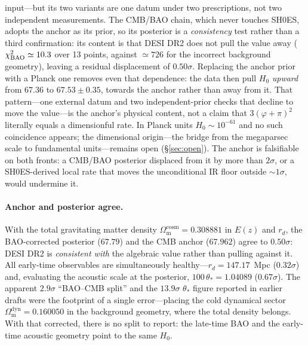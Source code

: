 \documentclass[a4paper,11pt]{article}
\newcommand{\Om}{\Omega_{\mathrm{m}}}
\begin{document}
input---but its two variants are one datum under two prescriptions, not two
independent measurements. The CMB/BAO chain, which never touches SH0ES, adopts
the anchor as its prior, so its posterior is a \emph{consistency} test rather
than a third confirmation: its content is that DESI DR2 does not pull the value
away ($\chi^2_{\rm BAO}\simeq10.3$ over 13 points, against $\simeq726$ for the
incorrect background geometry), leaving a residual displacement of
$0.50\sigma$. Replacing the anchor prior with a Planck one removes even that
dependence: the data then pull $H_0$ \emph{upward} from $67.36$ to
$67.53\pm0.35$, towards the anchor rather than away from it. That
pattern---one external datum and two independent-prior checks that decline to
move the value---is the anchor's physical content, not a claim that
$3(\varphi+\pi)^2$ literally equals a dimensionful rate. In Planck units
$H_0\sim10^{-61}$ and no such coincidence appears; the dimensional
origin---the bridge from the megaparsec scale to fundamental units---remains
open (\S\ref{sec:open}). The anchor is falsifiable on both fronts: a CMB/BAO
posterior displaced from it by more than $2\sigma$, or a SH0ES-derived local
rate that moves the unconditional IR floor outside $\sim1\sigma$, would
undermine it.

\paragraph{Anchor and posterior agree.} With the total gravitating matter
density $\Om^{\mathrm{cosm}}=0.308881$ in $E(z)$ and $r_d$, the BAO-corrected
posterior ($67.79$) and the CMB anchor ($67.962$) agree to $0.50\sigma$: DESI
DR2 is \emph{consistent with} the algebraic value rather than pulling against
it. All early-time observables are simultaneously healthy---$r_d=147.17$~Mpc
($0.32\sigma$) and, evaluating the acoustic scale at the posterior,
$100\,\theta_\ast=1.04089$ ($0.67\sigma$). The apparent $2.9\sigma$
``BAO--CMB split'' and the $13.9\sigma$ $\theta_\ast$ figure reported in earlier
drafts were the footprint of a single error---placing the cold dynamical sector
$\Om^{\mathrm{dyn}}=0.160050$ in the background geometry, where the total density
belongs. With that corrected, there is no split to report: the late-time BAO and
the early-time acoustic geometry point to the same $H_0$.
\end{document}
